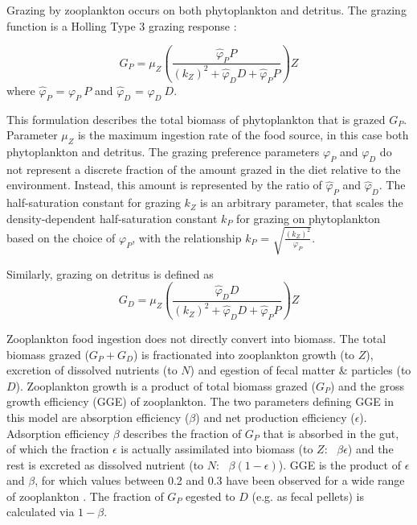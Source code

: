 \documentclass[journal abbreviation, manuscript]{copernicus}
\begin{document}
Grazing by zooplankton occurs on both phytoplankton and detritus. The grazing function is a Holling Type 3 grazing response \citep{Anderson2015c}:

\begin{equation}
    G_P = \mu_Z \left( \frac{ \hat{\varphi}_P P}{(k_Z)^2 + \hat{\varphi}_D D +\hat{\varphi}_P P}  \right) Z
\end{equation}
where $\hat{\varphi}_P$ = $\varphi_P \ P$ and $\hat{\varphi}_D$ = $\varphi_D \ D$.

This formulation describes the total biomass of phytoplankton that is grazed $G_P$. Parameter $\mu_Z$ is the maximum ingestion rate of the food source, in this case both phytoplankton and detritus.
The grazing preference parameters $\varphi_P$ and $\varphi_D$ do not represent a discrete fraction of the amount grazed in the diet relative to the environment. Instead, this amount is represented by the ratio of $\hat{\varphi}_P$ and $\hat{\varphi}_D$. 
The half-saturation constant for grazing $k_Z$ is an arbitrary parameter, that scales the density-dependent half-saturation constant $k_P$ for grazing on phytoplankton based on the choice of $\varphi_P$, with the relationship $k_P$ = $\sqrt{\frac{(k_Z)^2 }{\varphi_P}}$.

Similarly, grazing on detritus is defined as
\begin{equation}
    G_D = \mu_Z \left( \frac{ \hat{\varphi}_D D}{(k_Z)^2 + \hat{\varphi}_D D +\hat{\varphi}_P P}  \right) Z
\end{equation}

Zooplankton food ingestion does not directly convert into biomass. The total biomass grazed ($G_P + G_D$) is fractionated into zooplankton growth (to $Z$), excretion of dissolved nutrients (to $N$) and egestion of fecal matter \& particles (to $D$). Zooplankton growth is a product of total biomass grazed ($G_P$) and the gross growth efficiency (GGE) of zooplankton. The two parameters defining GGE in this model are absorption efficiency ($\beta$) and net production efficiency ($\epsilon$). Adsorption efficiency $\beta$ describes the fraction of $G_P$ that is absorbed in the gut, of which the fraction $\epsilon$ is actually assimilated into biomass (to $Z$: \ $\beta \epsilon$) and the rest is excreted as dissolved nutrient (to $N$: \ $\beta (1-\epsilon)$). GGE is the product of $\epsilon$ and $\beta$, for which values between 0.2 and 0.3 have been observed for a wide range of zooplankton \citep{Straile1997GrossGroup}. The fraction of $G_P$ egested to $D$ (e.g. as fecal pellets) is calculated via $1-\beta$. 
\end{document}
